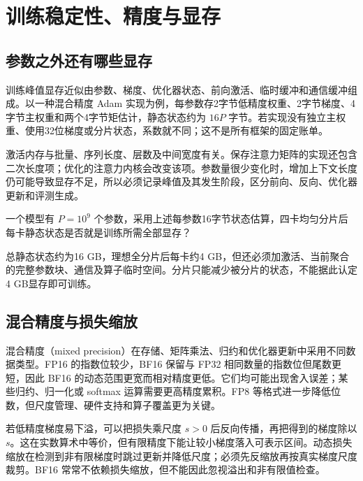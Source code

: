 \setcounter{chapter}{7} %
\chapter{训练稳定性、精度与显存}
\label{ch:stability}

\section{参数之外还有哪些显存}

训练峰值显存近似由参数、梯度、优化器状态、前向激活、临时缓冲和通信缓冲组成。以一种混合精度 Adam 实现为例，每参数存2字节低精度权重、2字节梯度、4字节主权重和两个4字节矩估计，静态状态约为 $16P$ 字节。若实现没有独立主权重、使用32位梯度或分片状态，系数就不同；这不是所有框架的固定账单。

激活内存与批量、序列长度、层数及中间宽度有关。保存注意力矩阵的实现还包含二次长度项；优化的注意力内核会改变该项。参数量很少变化时，增加上下文长度仍可能导致显存不足，所以必须记录峰值及其发生阶段，区分前向、反向、优化器更新和评测生成。

\begin{example}
一个模型有 $P=10^9$ 个参数，采用上述每参数16字节状态估算，四卡均匀分片后每卡静态状态是否就是训练所需全部显存？
\end{example}
\begin{solve}
总静态状态约为16 GB，理想全分片后每卡约4 GB，但还必须加激活、当前聚合的完整参数块、通信及算子临时空间。分片只能减少被分片的状态，不能据此认定4 GB显存即可训练。
\end{solve}

\section{混合精度与损失缩放}

混合精度（mixed precision）在存储、矩阵乘法、归约和优化器更新中采用不同数据类型。FP16 的指数位较少，BF16 保留与 FP32 相同数量的指数位但尾数更短，因此 BF16 的动态范围更宽而相对精度更低。它们均可能出现舍入误差；某些归约、归一化或 softmax 运算需要更高精度累积。FP8 等格式进一步降低位数，但尺度管理、硬件支持和算子覆盖更为关键。

若低精度梯度易下溢，可以把损失乘尺度 $s>0$ 后反向传播，再把得到的梯度除以 $s$。这在实数算术中等价，但有限精度下能让较小梯度落入可表示区间。动态损失缩放在检测到非有限梯度时跳过更新并降低尺度；必须先反缩放再按真实梯度尺度裁剪。BF16 常常不依赖损失缩放，但不能因此忽视溢出和非有限值检查。

